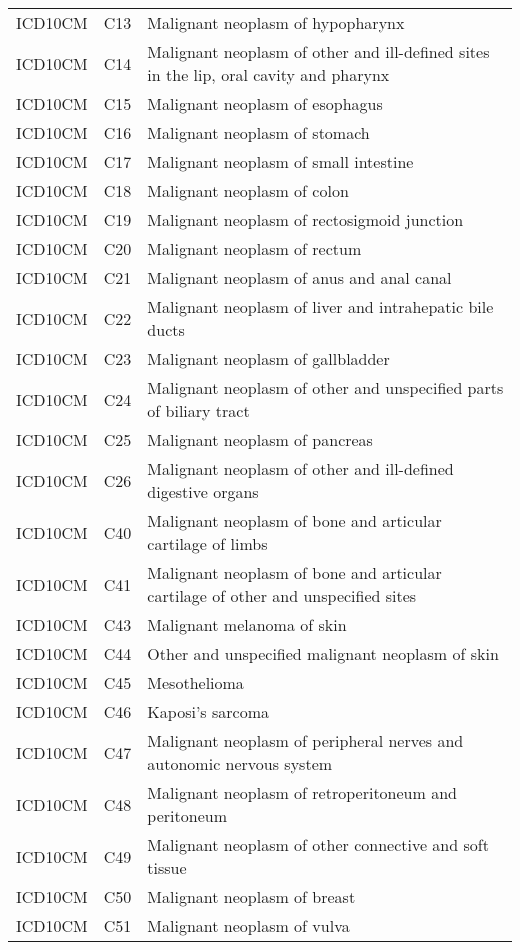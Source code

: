 \begin{longtable}{p{}p{}p{}}
  ICD10CM & C13 & Malignant neoplasm of hypopharynx \\ 
  ICD10CM & C14 & Malignant neoplasm of other and ill-defined sites in the lip, oral cavity and pharynx \\ 
  ICD10CM & C15 & Malignant neoplasm of esophagus \\ 
  ICD10CM & C16 & Malignant neoplasm of stomach \\ 
  ICD10CM & C17 & Malignant neoplasm of small intestine \\ 
  ICD10CM & C18 & Malignant neoplasm of colon \\ 
  ICD10CM & C19 & Malignant neoplasm of rectosigmoid junction \\ 
  ICD10CM & C20 & Malignant neoplasm of rectum \\ 
  ICD10CM & C21 & Malignant neoplasm of anus and anal canal \\ 
  ICD10CM & C22 & Malignant neoplasm of liver and intrahepatic bile ducts \\ 
  ICD10CM & C23 & Malignant neoplasm of gallbladder \\ 
  ICD10CM & C24 & Malignant neoplasm of other and unspecified parts of biliary tract \\ 
  ICD10CM & C25 & Malignant neoplasm of pancreas \\ 
  ICD10CM & C26 & Malignant neoplasm of other and ill-defined digestive organs \\ 
  ICD10CM & C40 & Malignant neoplasm of bone and articular cartilage of limbs \\ 
  ICD10CM & C41 & Malignant neoplasm of bone and articular cartilage of other and unspecified sites \\ 
  ICD10CM & C43 & Malignant melanoma of skin \\ 
  ICD10CM & C44 & Other and unspecified malignant neoplasm of skin \\ 
  ICD10CM & C45 & Mesothelioma \\ 
  ICD10CM & C46 & Kaposi's sarcoma \\ 
  ICD10CM & C47 & Malignant neoplasm of peripheral nerves and autonomic nervous system \\ 
  ICD10CM & C48 & Malignant neoplasm of retroperitoneum and peritoneum \\ 
  ICD10CM & C49 & Malignant neoplasm of other connective and soft tissue \\ 
  ICD10CM & C50 & Malignant neoplasm of breast \\ 
  ICD10CM & C51 & Malignant neoplasm of vulva \\ 

\end{longtable}
